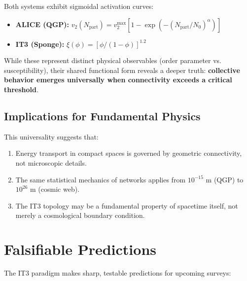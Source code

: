 \documentclass[12pt,a4paper]{article}
\begin{document}
Both systems exhibit sigmoidal activation curves:
\begin{itemize}
    \item \textbf{ALICE (QGP):} $v_2(N_{\mathrm{part}}) = v_2^{\max}[1 - \exp(-(N_{\mathrm{part}}/N_0)^\alpha)]$
    \item \textbf{IT3 (Sponge):} $\xi(\phi) = [\phi/(1-\phi)]^{1.2}$
\end{itemize}

While these represent distinct physical observables (order parameter vs. susceptibility), their shared functional form reveals a deeper truth: \textbf{collective behavior emerges universally when connectivity exceeds a critical threshold}.

\subsection{Implications for Fundamental Physics}

This universality suggests that:
\begin{enumerate}
    \item Energy transport in compact spaces is governed by geometric connectivity, not microscopic details.
    \item The same statistical mechanics of networks applies from $10^{-15}$ m (QGP) to $10^{26}$ m (cosmic web).
    \item The IT3 topology may be a fundamental property of spacetime itself, not merely a cosmological boundary condition.
\end{enumerate}

\section{Falsifiable Predictions}

The IT3 paradigm makes sharp, testable predictions for upcoming surveys:
\end{document}
